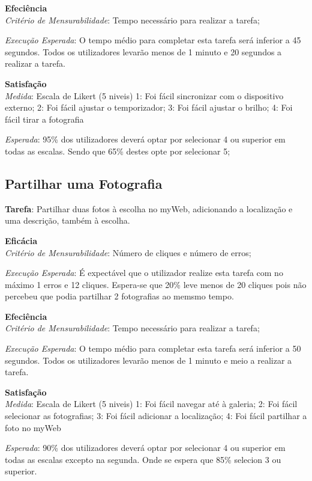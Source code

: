\documentclass[a4paper]{article}
\begin{document}
  \textbf{Efeciência}\\
  \textit{Critério de Mensurabilidade}: Tempo necessário para
  realizar a tarefa;

  \textit{Execução Esperada}: O tempo médio para completar esta
  tarefa será inferior a 45 segundos. Todos os utilizadores levarão
  menos de 1 minuto e 20 segundos a realizar a tarefa.

  \textbf{Satisfação}\\
  \textit{Medida}: Escala de Likert (5 niveis)
  1: Foi fácil sincronizar com o dispositivo externo;
  2: Foi fácil ajustar o temporizador;
  3: Foi fácil ajustar o brilho;
  4: Foi fácil tirar a fotografia

  \textit{Esperada}: 95\% dos utilizadores deverá optar por selecionar 4 ou superior em todas as escalas. Sendo que
  65\% destes opte por selecionar 5;

  \subsection{Partilhar uma Fotografia}
  \textbf{Tarefa}: Partilhar duas fotos à
  escolha no myWeb, adicionando a localização e uma descrição,
  também à escolha.

  \textbf{Eficácia}\\
  \textit{Critério de Mensurabilidade}: Número de cliques e
  número de erros;

  \textit{Execução Esperada}: É expectável que o utilizador
  realize esta tarefa com no máximo 1 erros e 12 cliques.
  Espera-se que 20\% leve menos de 20 cliques pois não
  percebeu que podia partilhar 2 fotografias ao memsmo tempo.

  \textbf{Efeciência}\\
  \textit{Critério de Mensurabilidade}: Tempo necessário para
  realizar a tarefa;

  \textit{Execução Esperada}: O tempo médio para completar esta
  tarefa será inferior a 50 segundos. Todos os utilizadores levarão
  menos de 1 minuto e meio a realizar a tarefa.

  \textbf{Satisfação}\\
  \textit{Medida}: Escala de Likert (5 niveis)
  1: Foi fácil navegar até à galeria;
  2: Foi fácil selecionar as fotografias;
  3: Foi fácil adicionar a localização;
  4: Foi fácil partilhar a foto no myWeb

  \textit{Esperada}: 90\% dos utilizadores deverá optar por selecionar
  4 ou superior em todas as escalas excepto na segunda.
  Onde se espera que 85\% selecion 3 ou superior.
\end{document}
